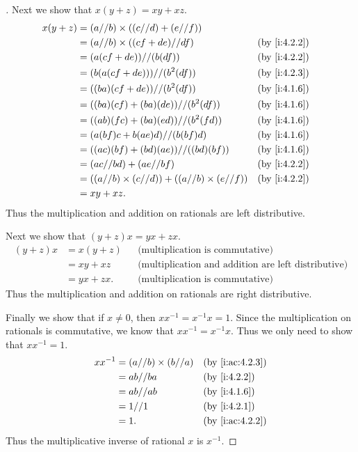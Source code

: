 \begin{proof}[]
  Next we show that \(x(y + z) = xy + xz\).
  \begin{align*}
    x(y + z) & = (a // b) \times ((c // d) + (e // f))                                     \\
             & = (a // b) \times ((cf + de) // df)                       &  & \by{i:4.2.2} \\
             & = (a(cf + de)) // (b(df))                                 &  & \by{i:4.2.2} \\
             & = (b(a(cf + de))) // (b^2(df))                            &  & \by{i:4.2.3} \\
             & = ((ba)(cf + de)) // (b^2(df))                            &  & \by{i:4.1.6} \\
             & = ((ba)(cf) + (ba)(de)) // (b^2(df))                      &  & \by{i:4.1.6} \\
             & = ((ab)(fc) + (ba)(ed)) // (b^2(fd))                      &  & \by{i:4.1.6} \\
             & = (a(bf)c + b(ae)d) // (b(bf)d)                           &  & \by{i:4.1.6} \\
             & = ((ac)(bf) + (bd)(ae)) // ((bd)(bf))                     &  & \by{i:4.1.6} \\
             & = (ac // bd) + (ae // bf)                                 &  & \by{i:4.2.2} \\
             & = ((a // b) \times (c // d)) + ((a // b) \times (e // f)) &  & \by{i:4.2.2} \\
             & = xy + xz.
  \end{align*}
  Thus the multiplication and addition on rationals are left distributive.

  Next we show that \((y + z)x = yx + zx\).
  \begin{align*}
    (y + z)x & = x(y + z) &  & \text{(multiplication is commutative)}                     \\
             & = xy + xz  &  & \text{(multiplication and addition are left distributive)} \\
             & = yx + zx. &  & \text{(multiplication is commutative)}
  \end{align*}
  Thus the multiplication and addition on rationals are right distributive.

  Finally we show that if \(x \neq 0\), then \(xx^{-1} = x^{-1}x = 1\).
  Since the multiplication on rationals is commutative, we know that \(xx^{-1} = x^{-1}x\).
  Thus we only need to show that \(xx^{-1} = 1\).
  \begin{align*}
    xx^{-1} & = (a // b) \times (b // a) &  & \by{i:ac:4.2.3} \\
            & = ab // ba                 &  & \by{i:4.2.2}    \\
            & = ab // ab                 &  & \by{i:4.1.6}    \\
            & = 1 // 1                   &  & \by{i:4.2.1}    \\
            & = 1.                       &  & \by{i:ac:4.2.2}
  \end{align*}
  Thus the multiplicative inverse of rational \(x\) is \(x^{-1}\).
\end{proof}

